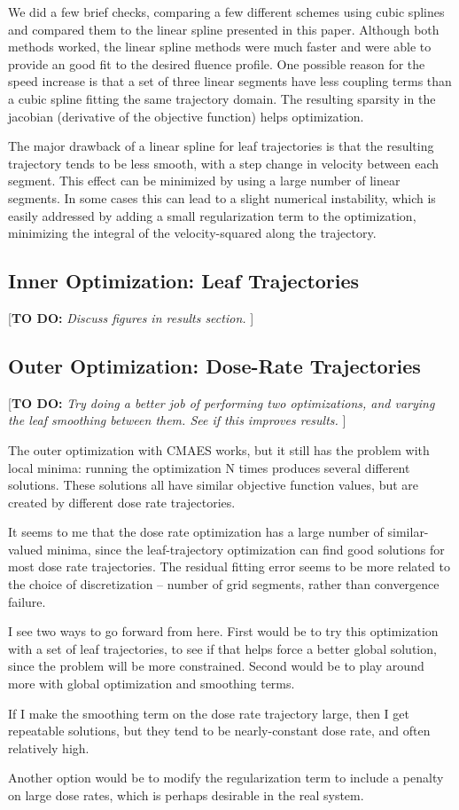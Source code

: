 \documentclass[12pt]{article}
\newcommand{\todo}[1]{{\color{lightblue}\par {[{\bf TO DO: } {\em #1}} ] \\    }}
\begin{document}
We did a few brief checks, comparing a few different schemes using cubic splines and compared them
to the linear spline presented in this paper. Although both methods worked, the linear spline methods
were much faster and were able to provide an good fit to the desired fluence profile.
One possible reason for the speed increase is that a set of three linear segments have less
coupling terms than a cubic spline fitting the same trajectory domain. The resulting sparsity in the
jacobian (derivative of the objective function) helps optimization. \cite{Betts2010}

The major drawback of a linear spline for leaf trajectories is that the resulting trajectory tends
to be less smooth, with a step change in velocity between each segment. This effect can be minimized
by using a large number of linear segments. In some cases this can lead to a slight numerical
instability, which is easily addressed by adding a small regularization term to the optimization,
minimizing the integral of the velocity-squared along the trajectory.


\subsection{Inner Optimization:  Leaf Trajectories}

\todo{Discuss figures in results section.}


\subsection{Outer Optimization:  Dose-Rate Trajectories}

\todo{Try doing a better job of performing two optimizations, and varying the leaf smoothing between them.
      See if this improves results.}

The outer optimization with CMAES works, but it still has the problem with local minima:
running the optimization N times produces several different solutions.
These solutions all have similar objective function values, but are created by different
dose rate trajectories.

It seems to me that the dose rate optimization has a large number of similar-valued minima,
since the leaf-trajectory optimization can find good solutions for most dose rate trajectories.
The residual fitting error seems to be more related to the choice of discretization -- number of
grid segments, rather than convergence failure.

I see two ways to go forward from here. First would be to try this optimization with a set of
leaf trajectories, to see if that helps force a better global solution, since the problem will
be more constrained. Second would be to play around more with global optimization and smoothing
terms.

If I make the smoothing term on the dose rate trajectory large, then I get repeatable solutions,
but they tend to be nearly-constant dose rate, and often relatively high.

Another option would be to modify the regularization term to include a  penalty on large
dose rates, which is perhaps desirable in the real system.





\end{document}
